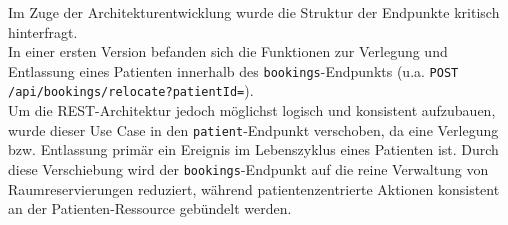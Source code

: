 Im Zuge der Architekturentwicklung wurde die Struktur der Endpunkte kritisch hinterfragt.\\
In einer ersten Version befanden sich die Funktionen zur Verlegung und Entlassung eines Patienten innerhalb des \texttt{bookings}-Endpunkts (u.a. \texttt{POST /api/bookings/relocate?patientId=}). \\
Um die REST-Architektur jedoch möglichst logisch und konsistent aufzubauen, wurde dieser Use Case in den \texttt{patient}-Endpunkt verschoben, da eine Verlegung bzw. Entlassung primär ein Ereignis im Lebenszyklus eines Patienten ist. 
Durch diese Verschiebung wird der \texttt{bookings}-Endpunkt auf die reine Verwaltung von Raumreservierungen reduziert, während patientenzentrierte Aktionen konsistent an der Patienten-Ressource gebündelt werden. 
